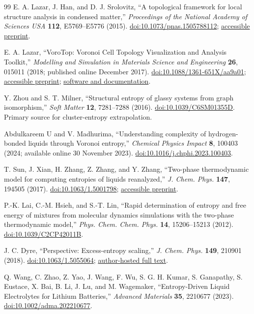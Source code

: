 \documentclass[11pt,a4paper]{article}
\begin{document}
\begin{thebibliography}{99}
E. A. Lazar, J. Han, and D. J. Srolovitz, ``A topological framework for local
structure analysis in condensed matter,'' \textit{Proceedings of the National
Academy of Sciences USA} \textbf{112}, E5769--E5776 (2015).
\href{https://doi.org/10.1073/pnas.1505788112}{doi:10.1073/pnas.1505788112};
\href{https://arxiv.org/abs/1508.05937}{accessible preprint}.

E. A. Lazar, ``VoroTop: Voronoi Cell Topology Visualization and Analysis
Toolkit,'' \textit{Modelling and Simulation in Materials Science and
Engineering} \textbf{26}, 015011 (2018; published online December 2017).
\href{https://doi.org/10.1088/1361-651X/aa9a01}{doi:10.1088/1361-651X/aa9a01};
\href{https://arxiv.org/abs/1804.04221}{accessible preprint};
\href{https://www.vorotop.org/}{software and documentation}.

Y. Zhou and S. T. Milner, ``Structural entropy of glassy systems from graph
isomorphism,'' \textit{Soft Matter} \textbf{12}, 7281--7288 (2016).
\href{https://doi.org/10.1039/C6SM01355D}{doi:10.1039/C6SM01355D}.
Primary source for cluster-entropy extrapolation.

Abdulkareem U and V. Madhurima, ``Understanding complexity of hydrogen-bonded
liquids through Voronoi entropy,'' \textit{Chemical Physics Impact}
\textbf{8}, 100403 (2024; available online 30 November 2023).
\href{https://doi.org/10.1016/j.chphi.2023.100403}{doi:10.1016/j.chphi.2023.100403}.

T. Sun, J. Xian, H. Zhang, Z. Zhang, and Y. Zhang,
``Two-phase thermodynamic model for computing entropies of liquids reanalyzed,''
\textit{J. Chem. Phys.} \textbf{147}, 194505 (2017).
\href{https://doi.org/10.1063/1.5001798}{doi:10.1063/1.5001798};
\href{https://arxiv.org/abs/1711.02041}{accessible preprint}.

P.-K. Lai, C.-M. Hsieh, and S.-T. Lin,
``Rapid determination of entropy and free energy of mixtures from molecular
dynamics simulations with the two-phase thermodynamic model,''
\textit{Phys. Chem. Chem. Phys.} \textbf{14}, 15206--15213 (2012).
\href{https://doi.org/10.1039/C2CP42011B}{doi:10.1039/C2CP42011B}.

J. C. Dyre, ``Perspective: Excess-entropy scaling,''
\textit{J. Chem. Phys.} \textbf{149}, 210901 (2018).
\href{https://doi.org/10.1063/1.5055064}{doi:10.1063/1.5055064};
\href{https://jcdyre.dk/2018_JCP_149_210901.pdf}{author-hosted full text}.

Q. Wang, C. Zhao, Z. Yao, J. Wang, F. Wu, S. G. H. Kumar, S. Ganapathy,
S. Eustace, X. Bai, B. Li, J. Lu, and M. Wagemaker,
``Entropy-Driven Liquid Electrolytes for Lithium Batteries,''
\textit{Advanced Materials} \textbf{35}, 2210677 (2023).
\href{https://doi.org/10.1002/adma.202210677}{doi:10.1002/adma.202210677}.
\end{thebibliography}
\end{document}

